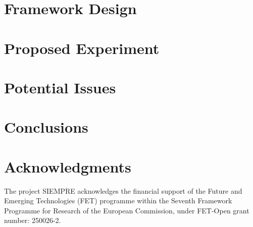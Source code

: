 \documentclass{sig-alternate}
\begin{document}
\section{Framework Design}

\section{Proposed Experiment}

\section{Potential Issues}

\section{Conclusions}


\section{Acknowledgments}
The project SIEMPRE acknowledges the financial support of the Future and Emerging Technologies (FET) programme within the Seventh Framework Programme for Research of the European Commission, under FET-Open grant number: 250026-2.

%


%
%
\end{document}
